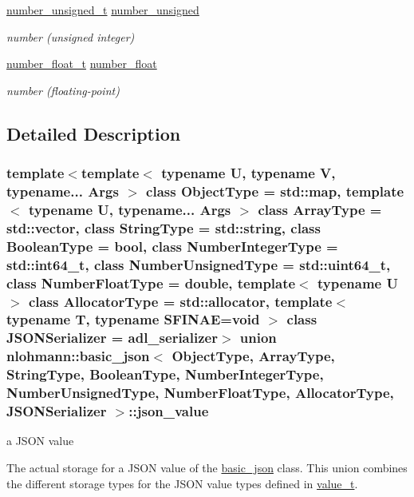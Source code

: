 \begin{DoxyCompactItemize}
\mbox{\hyperlink{classnlohmann_1_1basic__json_ab906e29b5d83ac162e823ada2156b989}{number\+\_\+unsigned\+\_\+t}} \mbox{\hyperlink{unionnlohmann_1_1basic__json_1_1json__value_a0299a6aa3bc4d45d54130e52970f73d3}{number\+\_\+unsigned}}
\begin{DoxyCompactList}\small\item\em number (unsigned integer) \end{DoxyCompactList}\item 
\mbox{\hyperlink{classnlohmann_1_1basic__json_a88d6103cb3620410b35200ee8e313d97}{number\+\_\+float\+\_\+t}} \mbox{\hyperlink{unionnlohmann_1_1basic__json_1_1json__value_ad003495e39e78b8096e0b6fc690d146f}{number\+\_\+float}}
\begin{DoxyCompactList}\small\item\em number (floating-\/point) \end{DoxyCompactList}\end{DoxyCompactItemize}


\subsection{Detailed Description}
\subsubsection*{template$<$template$<$ typename U, typename V, typename... Args $>$ class Object\+Type = std\+::map, template$<$ typename U, typename... Args $>$ class Array\+Type = std\+::vector, class String\+Type = std\+::string, class Boolean\+Type = bool, class Number\+Integer\+Type = std\+::int64\+\_\+t, class Number\+Unsigned\+Type = std\+::uint64\+\_\+t, class Number\+Float\+Type = double, template$<$ typename U $>$ class Allocator\+Type = std\+::allocator, template$<$ typename T, typename S\+F\+I\+N\+A\+E=void $>$ class J\+S\+O\+N\+Serializer = adl\+\_\+serializer$>$\newline
union nlohmann\+::basic\+\_\+json$<$ Object\+Type, Array\+Type, String\+Type, Boolean\+Type, Number\+Integer\+Type, Number\+Unsigned\+Type, Number\+Float\+Type, Allocator\+Type, J\+S\+O\+N\+Serializer $>$\+::json\+\_\+value}

a J\+S\+ON value 

The actual storage for a J\+S\+ON value of the \mbox{\hyperlink{classnlohmann_1_1basic__json}{basic\+\_\+json}} class. This union combines the different storage types for the J\+S\+ON value types defined in \mbox{\hyperlink{classnlohmann_1_1basic__json_ae8cbef097f7da18a781fc86587de6b90}{value\+\_\+t}}.

